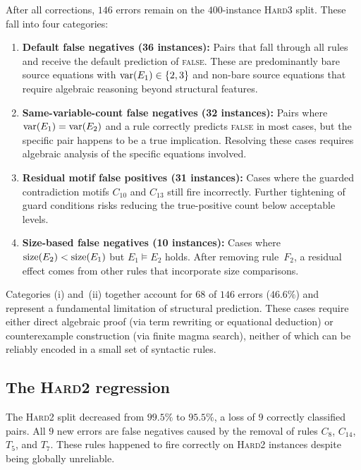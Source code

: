 After all corrections, $146$ errors remain on the $400$-instance
\textsc{Hard3} split.  These fall into four categories:
\begin{enumerate}[label=(\roman*)]
\item \textbf{Default false negatives (36 instances):} Pairs that
  fall through all rules and receive the default prediction of
  \textsc{false}.  These are predominantly bare source equations
  with $\operatorname{var}(E_1) \in \{2, 3\}$ and non-bare source equations that
  require algebraic reasoning beyond structural features.

\item \textbf{Same-variable-count false negatives (32 instances):}
  Pairs where $\operatorname{var}(E_1) = \operatorname{var}(E_2)$ and a rule correctly predicts
  \textsc{false} in most cases, but the specific pair happens to be
  a true implication.  Resolving these cases requires algebraic
  analysis of the specific equations involved.

\item \textbf{Residual motif false positives (31 instances):}
  Cases where the guarded contradiction motifs $C_{10}$ and $C_{13}$
  still fire incorrectly.  Further tightening of guard conditions
  risks reducing the true-positive count below acceptable levels.

\item \textbf{Size-based false negatives (10 instances):} Cases
  where $\operatorname{size}(E_2) < \operatorname{size}(E_1)$ but $E_1 \models E_2$ holds.
  After removing rule~$F_2$, a residual effect comes from other
  rules that incorporate size comparisons.
\end{enumerate}

\begin{remark}\label{rem:algebraic-gap}
Categories (i) and~(ii) together account for $68$ of $146$ errors
($46.6\%$) and represent a fundamental limitation of structural
prediction.  These cases require either direct algebraic proof (via
term rewriting or equational deduction) or counterexample construction
(via finite magma search), neither of which can be reliably encoded
in a small set of syntactic rules.
\end{remark}

\subsection{The \textsc{Hard2} regression}\label{subsec:hard2}

The \textsc{Hard2} split decreased from $99.5\%$ to $95.5\%$,
a loss of $9$ correctly classified pairs.  All $9$ new errors
are false negatives caused by the removal of rules $C_8$, $C_{14}$,
$T_5$, and $T_7$.  These rules happened to fire correctly on
\textsc{Hard2} instances despite being globally unreliable.

